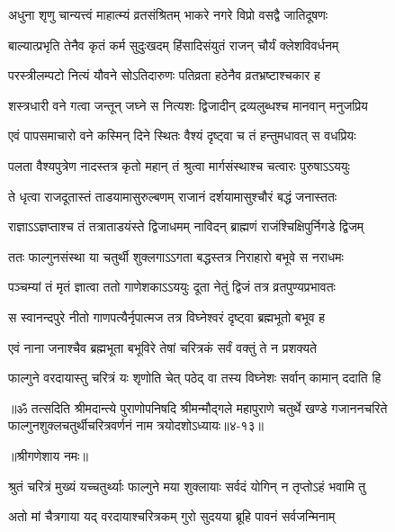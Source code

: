 \twolineshloka
{अधुना श‍ृणु चान्यत्त्वं माहात्म्यं व्रतसंश्रितम्}
{भाकरे नगरे विप्रो वसद्वै जातिदूषणः} %

\twolineshloka
{बाल्यात्प्रभृति तेनैव कृतं कर्म सुदुःखदम्}
{हिंसादिसंयुतं राजन् चौर्यं क्लेशविवर्धनम्} %

\twolineshloka
{परस्त्रीलम्पटो नित्यं यौवने सोऽतिदारुणः}
{पतिव्रता हठेनैव व्रतभ्रष्टाश्चकार ह} %

\twolineshloka
{शस्त्रधारी वने गत्वा जन्तून् जघ्ने स नित्यशः}
{द्विजादीन् द्रव्यलुब्धश्च मानवान् मनुजप्रिय} %

\twolineshloka
{एवं पापसमाचारो वने कस्मिन् दिने स्थितः}
{वैश्यं दृष्ट्वा च तं हन्तुमधावत् स वधप्रियः} %

\twolineshloka
{पलता वैश्यपुत्रेण नादस्तत्र कृतो महान्}
{तं श्रुत्वा मार्गसंस्थाश्च चत्वारः पुरुषाऽऽययुः} %

\twolineshloka
{ते धृत्वा राजदूतास्तं ताडयामासुरुल्बणम्}
{राजानं दर्शयामासुश्चौरं बद्धं जनास्ततः} %

\twolineshloka
{राज्ञाऽऽज्ञप्ताश्च तं तत्राताडयंस्ते द्विजाधमम्}
{नाविदन् ब्राह्मणं राजंश्चिक्षिपुर्निगडे द्विजम्} %

\twolineshloka
{ततः फाल्गुनसंस्था या चतुर्थी शुक्लगाऽऽगता}
{बद्धस्तत्र निराहारो बभूवे स नराधमः} %

\twolineshloka
{पञ्चम्यां तं मृतं ज्ञात्वा ततो गाणेशकाऽऽययुः}
{दूता नेतुं द्विजं तत्र व्रतपुण्यप्रभावतः} %

\twolineshloka
{स स्वानन्दपुरे नीतो गाणपत्यैर्नृपात्मज}
{तत्र विघ्नेश्वरं दृष्ट्वा ब्रह्मभूतो बभूव ह} %

\twolineshloka
{एवं नाना जनाश्चैव ब्रह्मभूता बभूविरे}
{तेषां चरित्रकं सर्वं वक्तुं ते न प्रशक्यते} %

\twolineshloka
{फाल्गुने वरदायास्तु चरित्रं यः श‍ृणोति चेत्}
{पठेद् वा तस्य विघ्नेशः सर्वान् कामान् ददाति हि} %

॥ॐ तत्सदिति श्रीमदान्त्ये पुराणोपनिषदि श्रीमन्मौद्गले महापुराणे चतुर्थे खण्डे गजाननचरिते फाल्गुनशुक्लचतुर्थीचरित्रवर्णनं नाम त्रयोदशोऽध्यायः॥४-१३॥


\label{sec:chaitra-shukla-chaturthi-mahatmya-varnanam}

\centerline{॥श्रीगणेशाय नमः॥}


\twolineshloka
{श्रुतं चरित्रं मुख्यं यच्चतुर्थ्याः फाल्गुने मया}
{शुक्लायाः सर्वदं योगिन् न तृप्तोऽहं भवामि तु} %

\twolineshloka
{अतो मां चैत्रगाया यद् वरदायाश्चरित्रकम्}
{गुरो सुदयया ब्रूहि पावनं सर्वजन्मिनाम्} %


